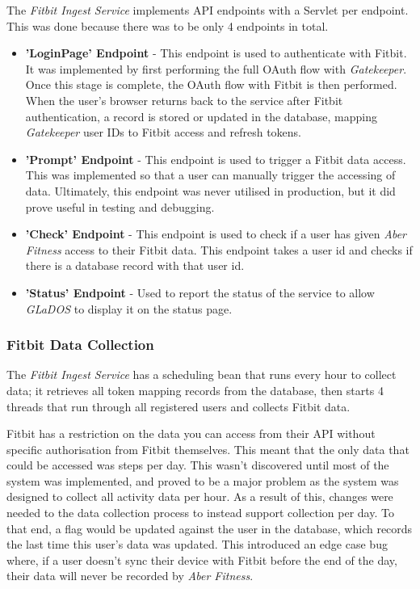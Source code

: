 The \textit{Fitbit Ingest Service} implements API endpoints with a Servlet per endpoint. This was done because there was to be only 4 endpoints in total.

\begin{itemize}
	\item \textbf{'LoginPage' Endpoint} - This endpoint is used to authenticate with Fitbit. It was implemented by first performing the full OAuth flow with \textit{Gatekeeper}. Once this stage is complete, the OAuth flow with Fitbit is then performed. When the user's browser returns back to the service after Fitbit authentication, a record is stored or updated in the database, mapping
	\textit{Gatekeeper} user IDs to Fitbit access and refresh tokens.

	\item \textbf{'Prompt' Endpoint} - This endpoint is used to trigger a Fitbit data access. This was implemented so that a user can manually trigger the accessing of data. Ultimately, this endpoint was never utilised in production, but it did prove useful in testing and debugging.

	\item \textbf{'Check' Endpoint} - This endpoint is used to check if a user has given \textit{Aber Fitness} access to their Fitbit data. This endpoint takes a user id and checks if there is a database record with that user id.

    \item \textbf{'Status' Endpoint} - Used to report the status of the service to allow \textit{GLaDOS} to display it on the status page.
\end{itemize}

\subsubsection{Fitbit Data Collection}

The \textit{Fitbit Ingest Service} has a scheduling bean that runs every hour to collect data; it retrieves all token mapping records from the database, then starts 4 threads that run through all registered users and collects Fitbit data.

Fitbit has a restriction on the data you can access from their API without specific authorisation from Fitbit themselves. This meant that the only data that could be accessed was steps per day. This wasn't discovered until most of the system was implemented, and proved to be a major problem as the system was designed to collect all activity data per hour. As a result of this, changes were needed to the data collection process to instead support collection per day. To that end, a flag would be updated against the user in the database, which records the last time this user's data was updated. This introduced an edge case bug where, if a user doesn't sync their device with Fitbit before the end of the day, their data will never be recorded by \textit{Aber Fitness}.

